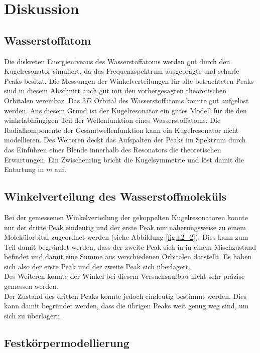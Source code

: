 \section{Diskussion}
\label{sec:diskussion}

\subsection{Wasserstoffatom}

Die diskreten Energieniveaus des Wasserstoffatoms werden gut durch den Kugelresonator simuliert, da das Frequenzspektrum ausgeprägte und scharfe Peaks besitzt. 
Die Messungen der Winkelverteilungen für alle betrachteten Peaks sind in diesem Abschnitt auch gut mit den vorhergesagten theoretischen Orbitalen vereinbar. Das $3D$ Orbital des Wasserstoffatoms konnte gut aufgelöst werden.
Aus diesem Grund ist der Kugelresonator ein gutes Modell für die den winkelabhängigen Teil der Wellenfunktion eines Wasserstoffatoms. Die Radialkomponente der Gesamtwellenfunktion kann ein Kugelresonator nicht modellieren.  
Des Weiteren deckt das Aufspalten der Peaks im Spektrum durch das Einführen einer Blende innerhalb des Resonators die theoretischen Erwartungen. Ein Zwischenring bricht die Kugelsymmetrie und löst damit die Entartung in $m$ auf. 
\subsection{Winkelverteilung des Wasserstoffmoleküls}

Bei der gemessenen Winkelverteilung der gekoppelten Kugelresonatoren konnte nur der dritte Peak eindeutig und der erste Peak nur näherungsweise zu einem Molekülorbital zugeordnet werden (siehe Abbildung \ref{fig:h2_2}). 
Dies kann zum Teil damit begründet werden, dass der zweite Peak sich in in einem Mischzustand befindet und damit eine Summe aus verschiedenen Orbitalen darstellt. Es haben sich also der erste Peak und der zweite Peak sich überlagert. \\
Des Weiteren konnte der Winkel bei diesem Versuchsaufbau nicht sehr präzise gemessen werden.\\
Der Zustand des dritten Peaks konnte jedoch eindeutig bestimmt werden. Dies kann damit begründet werden, dass die übrigen Peaks weit genug weg sind, um sich zu überlagern.
\subsection{Festkörpermodellierung}

